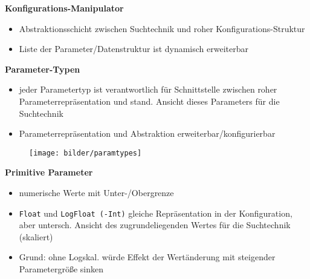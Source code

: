 

  \begin{frame}
  \textbf{Konfigurations-Manipulator}
  \begin{itemize}
    \item Abstraktionsschicht zwischen Suchtechnik und roher Konfigurations-Struktur
    \item Liste der Parameter/Datenstruktur ist dynamisch erweiterbar
  \end{itemize}
  \textbf{Parameter-Typen}
  \begin{itemize}
    \item jeder Parametertyp ist verantwortlich für Schnittstelle zwischen roher 
    Parameterrepräsentation und stand. Ansicht dieses Parameters für die Suchtechnik
    \item Parameterrepräsentation und Abstraktion erweiterbar/konfigurierbar
  \end{itemize}
  \end{frame}
  
  \begin{frame}
    \begin{figure}[ht]
      \centering	      
      \texttt{[image: bilder/paramtypes]}
      \label{paramtypes}
    \end{figure}
    
  \textbf{Primitive Parameter}
  \begin{itemize}
    \item numerische Werte mit Unter-/Obergrenze
    \item \texttt{Float} und \texttt{LogFloat (-Int)} gleiche Repräsentation in der Konfiguration, aber 
    untersch. Ansicht des zugrundeliegenden Wertes für die Suchtechnik (skaliert)
    \item Grund: ohne Logskal. würde Effekt der Wertänderung mit steigender Parametergröße sinken
  \end{itemize}
  \end{frame}
  
